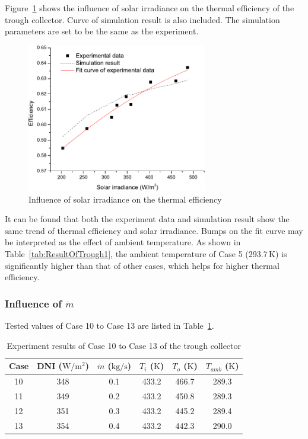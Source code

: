 Figure~\ref{fig:I_r-eta-trough} shows the influence of solar irradiance on the thermal efficiency of the trough collector. Curve of simulation result is also included. The simulation parameters are set to be the same as the experiment. 
\begin{figure}[!ht]
\centering
\includegraphics[width=0.7\textwidth]{fig/I_r-eta-trough}
\caption{Influence of solar irradiance on the thermal efficiency}
\label{fig:I_r-eta-trough}
\end{figure}

It can be found that both the experiment data and simulation result show the same trend of thermal efficiency and solar irradiance. Bumps on the fit curve may be interpreted as the effect of ambient temperature. As shown in Table~\ref{tab:ResultOfTrough1}, the ambient temperature of Case 5 (293.7$\,\mathrm{K}$) is significantly higher than that of other cases, which helps for higher thermal efficiency.

\subsubsection{Influence of $\dot{m}$}
Tested values of Case 10 to Case 13 are listed in Table~\ref{tab:ResultOfTrough2}.

\begin{table}[htbp]\footnotesize
	\caption{Experiment results of Case 10 to Case 13 of the trough collector}
	\begin{center}
	\begin{tabular}{cccccc}
		\toprule
		Case	& DNI ($\mathrm{W/m^2}$)	&	$\dot{m}$ ($\mathrm{kg/s}$)			&	$T_i$ ($\mathrm{K}$)	&	$T_o$ ($\mathrm{K}$)		&	$T_{amb}$ ($\mathrm{K}$)\\
		\midrule
		10	&	348	&	0.1	&	433.2	&	466.7	&	289.3\\
		11	&	349	&	0.2	&	433.2	&	450.8	&	289.3\\
		12	&	351	&	0.3	&	433.2	&	445.2	&	289.4	\\
		13	&	354	&	0.4	&	433.2	&	442.3	&	290.0\\
		\bottomrule
	\end{tabular}
	\end{center}
	\label{tab:ResultOfTrough2}
\end{table}

